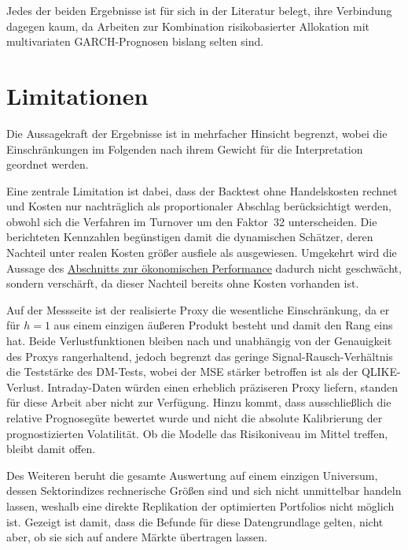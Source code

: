 \documentclass[a4paper, 12pt]{article}
\begin{document}
Jedes der beiden Ergebnisse ist für sich in der Literatur belegt, ihre Verbindung dagegen kaum, da Arbeiten zur Kombination risikobasierter Allokation mit multivariaten GARCH-Prognosen bislang selten sind.

\section{Limitationen}\label{sec:limitationen}
Die Aussagekraft der Ergebnisse ist in mehrfacher Hinsicht begrenzt, wobei die Einschränkungen im Folgenden nach ihrem Gewicht für die Interpretation geordnet werden.

Eine zentrale Limitation ist dabei, dass der Backtest ohne Handelskosten rechnet und Kosten nur nachträglich als proportionaler Abschlag berücksichtigt werden, obwohl sich die Verfahren im Turnover um den Faktor~32 unterscheiden.
Die berichteten Kennzahlen begünstigen damit die dynamischen Schätzer, deren Nachteil unter realen Kosten größer ausfiele als ausgewiesen.
Umgekehrt wird die Aussage des \hyperref[sec:oekonomisch]{Abschnitts zur ökonomischen Performance} dadurch nicht geschwächt, sondern verschärft, da dieser Nachteil bereits ohne Kosten vorhanden ist.

Auf der Messseite ist der realisierte Proxy die wesentliche Einschränkung, da er für $h = 1$ aus einem einzigen äußeren Produkt besteht und damit den Rang eins hat.
Beide Verlustfunktionen bleiben nach \textcite{patton2011} und \textcite{laurent2013} unabhängig von der Genauigkeit des Proxys rangerhaltend, jedoch begrenzt das geringe Signal-Rausch-Verhältnis die Teststärke des DM-Tests, wobei der MSE stärker betroffen ist als der QLIKE-Verlust.
Intraday-Daten würden einen erheblich präziseren Proxy liefern, standen für diese Arbeit aber nicht zur Verfügung.
Hinzu kommt, dass ausschließlich die relative Prognosegüte bewertet wurde und nicht die absolute Kalibrierung der prognostizierten Volatilität.
Ob die Modelle das Risikoniveau im Mittel treffen, bleibt damit offen.

Des Weiteren beruht die gesamte Auswertung auf einem einzigen Universum, dessen Sektorindizes rechnerische Größen sind und sich nicht unmittelbar handeln lassen, weshalb eine direkte Replikation der optimierten Portfolios nicht möglich ist.
Gezeigt ist damit, dass die Befunde für diese Datengrundlage gelten, nicht aber, ob sie sich auf andere Märkte übertragen lassen.

\end{document}
